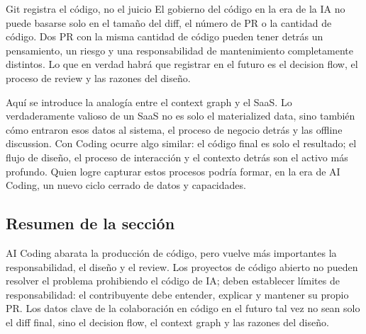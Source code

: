 \begin{warningbox}{Git registra el código, no el juicio}
El gobierno del código en la era de la IA no puede basarse solo en el tamaño del diff, el número de PR o la cantidad de código. Dos PR con la misma cantidad de código pueden tener detrás un pensamiento, un riesgo y una responsabilidad de mantenimiento completamente distintos. Lo que en verdad habrá que registrar en el futuro es el decision flow, el proceso de review y las razones del diseño.
\end{warningbox}

Aquí se introduce la analogía entre el context graph y el SaaS. Lo verdaderamente valioso de un SaaS no es solo el materialized data, sino también cómo entraron esos datos al sistema, el proceso de negocio detrás y las offline discussion. Con Coding ocurre algo similar: el código final es solo el resultado; el flujo de diseño, el proceso de interacción y el contexto detrás son el activo más profundo. Quien logre capturar estos procesos podría formar, en la era de AI Coding, un nuevo ciclo cerrado de datos y capacidades.

\subsection{Resumen de la sección}

AI Coding abarata la producción de código, pero vuelve más importantes la responsabilidad, el diseño y el review. Los proyectos de código abierto no pueden resolver el problema prohibiendo el código de IA; deben establecer límites de responsabilidad: el contribuyente debe entender, explicar y mantener su propio PR. Los datos clave de la colaboración en código en el futuro tal vez no sean solo el diff final, sino el decision flow, el context graph y las razones del diseño.
